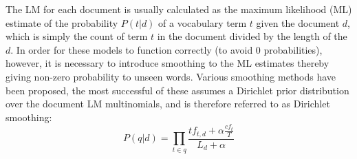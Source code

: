 The LM for each document is usually calculated as the maximum likelihood (ML) estimate of the probability $P(t|d)$ of a vocabulary term $t$ given the document $d$, which is simply the count of term $t$ in the document divided by the length of the $d$. In order for these models to function correctly (to avoid 0 probabilities), however, it is necessary to introduce smoothing to the ML estimates \cite{zhai:2004} thereby giving non-zero probability to unseen words. Various smoothing methods have been proposed, the most successful of these assumes a Dirichlet prior distribution over the document LM multinomials, and is therefore referred to as Dirichlet smoothing:
\begin{equation}
P(q|d) = \prod_{t \in q}\frac{tf_{t, d} + \alpha \frac{cf_t}{T}}{L_d + \alpha}
\end{equation}

